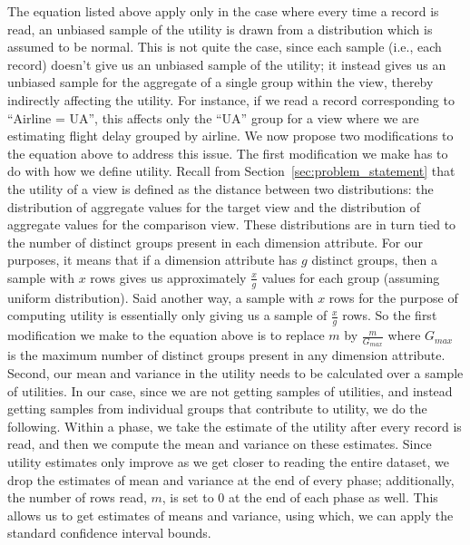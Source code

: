 The equation listed above apply only in the case
where every time a record is read, an unbiased sample
of the utility is drawn from a distribution which
is assumed to be normal. 
This is not quite the case, since each sample (i.e., each record)
doesn't give us an unbiased sample of the utility;
it instead gives us an unbiased sample for the aggregate
of a single group within the view, thereby indirectly affecting
the utility.
For instance, if we read a record corresponding to 
``Airline = UA'', this affects only the ``UA'' group
for a view where we are estimating flight delay grouped by airline.
We now propose two modifications to the equation above to address this issue.
The first modification we make has to do with how we define utility.
Recall from Section~\ref{sec:problem_statement}
that the utility of a view is
defined as the distance between two distributions: 
the distribution of aggregate values for the
target view and the distribution of aggregate values for the comparison view.
These distributions are in turn tied to the 
number of distinct groups present in
each dimension attribute.
For our purposes, it means that if a dimension attribute has $g$ distinct
groups, then a sample with $x$ rows gives us approximately $\frac{x}{g}$ 
values for each group (assuming uniform distribution).
Said another way, a sample with $x$ rows for the purpose of computing 
utility is essentially only giving us a sample of $\frac{x}{g}$ rows.
So the first modification we 
make to the equation above is to
replace $m$ by $\frac{m}{G_{max}}$ where $G_{max}$ is the maximum number of
distinct groups present in any dimension attribute.
Second, our mean and variance in the utility needs to be calculated 
over a sample of utilities. 
In our case, since we are not getting samples of utilities, 
and instead getting samples from individual groups that contribute
to utility, we do the following. 
Within a phase, we take the estimate of the utility after every
record is read, and then we compute the mean and variance on these estimates.
Since utility estimates only improve as we get closer to reading 
the entire dataset, we drop the estimates of mean and variance at the end
of every phase; additionally, the number of rows read, $m$, is set to $0$
at the end of each phase as well. This allows us to get estimates
of means and variance, using which, we can apply the standard 
confidence interval bounds.

